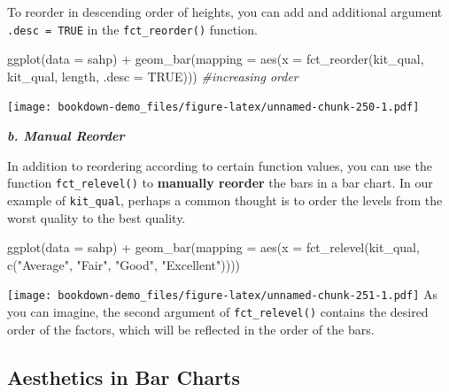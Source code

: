 \documentclass[
]{book}
\newenvironment{Shaded}{\begin{snugshade}}{\end{snugshade}}
\newcommand{\AttributeTok}[1]{\textcolor[rgb]{0.77,0.63,0.00}{#1}}
\newcommand{\CommentTok}[1]{\textcolor[rgb]{0.56,0.35,0.01}{\textit{#1}}}
\newcommand{\ConstantTok}[1]{\textcolor[rgb]{0.00,0.00,0.00}{#1}}
\newcommand{\FunctionTok}[1]{\textcolor[rgb]{0.00,0.00,0.00}{#1}}
\newcommand{\NormalTok}[1]{#1}
\newcommand{\SpecialCharTok}[1]{\textcolor[rgb]{0.00,0.00,0.00}{#1}}
\newcommand{\StringTok}[1]{\textcolor[rgb]{0.31,0.60,0.02}{#1}}
\begin{document}
To reorder in descending order of heights, you can add and additional argument \texttt{.desc\ =\ TRUE} in the \texttt{fct\_reorder()} function.

\begin{Shaded}
\begin{Highlighting}[]
\FunctionTok{ggplot}\NormalTok{(}\AttributeTok{data =}\NormalTok{ sahp) }\SpecialCharTok{+} \FunctionTok{geom\_bar}\NormalTok{(}\AttributeTok{mapping =} \FunctionTok{aes}\NormalTok{(}\AttributeTok{x =} \FunctionTok{fct\_reorder}\NormalTok{(kit\_qual, kit\_qual, length, }\AttributeTok{.desc =} \ConstantTok{TRUE}\NormalTok{))) }\CommentTok{\#increasing order}
\end{Highlighting}
\end{Shaded}

\texttt{[image: bookdown-demo\_files/figure-latex/unnamed-chunk-250-1.pdf]}

\textbf{\emph{b. Manual Reorder}}

In addition to reordering according to certain function values, you can use the function \texttt{fct\_relevel()} to \textbf{manually reorder} the bars in a bar chart. In our example of \texttt{kit\_qual}, perhaps a common thought is to order the levels from the worst quality to the best quality.

\begin{Shaded}
\begin{Highlighting}[]
\FunctionTok{ggplot}\NormalTok{(}\AttributeTok{data =}\NormalTok{ sahp) }\SpecialCharTok{+}
  \FunctionTok{geom\_bar}\NormalTok{(}\AttributeTok{mapping =} \FunctionTok{aes}\NormalTok{(}\AttributeTok{x =} \FunctionTok{fct\_relevel}\NormalTok{(kit\_qual, }\FunctionTok{c}\NormalTok{(}\StringTok{"Average"}\NormalTok{, }\StringTok{"Fair"}\NormalTok{, }\StringTok{"Good"}\NormalTok{, }\StringTok{"Excellent"}\NormalTok{))))}
\end{Highlighting}
\end{Shaded}

\texttt{[image: bookdown-demo\_files/figure-latex/unnamed-chunk-251-1.pdf]}
As you can imagine, the second argument of \texttt{fct\_relevel()} contains the desired order of the factors, which will be reflected in the order of the bars.

\hypertarget{aesthetics-in-bar-charts}{%
\subsection{Aesthetics in Bar Charts}\label{aesthetics-in-bar-charts}}
\end{document}
